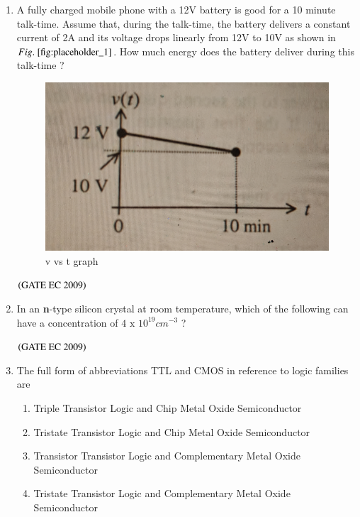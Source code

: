 \documentclass[journal,12pt,onecolumn]{IEEEtran}
\theoremstyle{remark}
\begin{document}
\begin{enumerate}[start=1, label={Q\arabic*.}]
\item A fully charged mobile phone with a 12V battery is good for a 10 minute talk-time. Assume that, during the talk-time, the battery delivers a constant current of 2A and its voltage drops linearly from 12V to 10V as shown in $\figref{fig:placeholder_1}$. How much energy does the battery deliver during this talk-time ?
\begin{figure}
    \centering
    \includegraphics[width=0.5\columnwidth]{figs/img_1.jpg}
    \caption{\centering v vs t graph}
    \label{fig:placeholder_1}
\end{figure}


\begin{enumerate}
\end{enumerate}
\hfill $\left(\text{GATE EC 2009}\right)$
\item In an \textbf{n}-type silicon crystal at room temperature, which of the following can have a concentration of $4 \text{ x } 10^{19}  cm^{-3}$ ?

\begin{enumerate}
\end{enumerate}
\hfill $\left(\text{GATE EC 2009}\right)$
\item The full form of abbreviations TTL and CMOS in reference to logic families are 
\begin{enumerate}
\item Triple Transistor Logic and Chip Metal Oxide Semiconductor
\item Tristate Transistor Logic and Chip Metal Oxide Semiconductor
\item Transistor Transistor Logic and Complementary Metal Oxide Semiconductor
\item Tristate Transistor Logic and Complementary Metal Oxide Semiconductor


\end{enumerate}
\end{enumerate}
\end{document}
